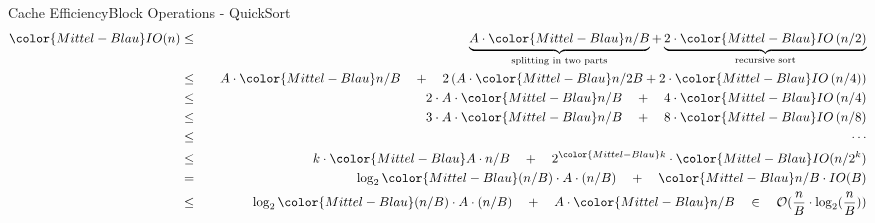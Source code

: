 \begin{frame}{Cache Efficiency}{Block Operations - QuickSort}
{\color{Mittel-Blau}
  \begin{eqnarray*}
    {\color{Mittel-Blau}IO(n)} &\leq\hspace{1em}&
      \underbrace{
        A \cdot {\color{Mittel-Blau}n / B}
      }_{\text{splitting in two parts}}
      +
      \underbrace{
        2 \cdot {\color{Mittel-Blau}IO\left(n / 2 \right)}
      }_{\text{recursive sort}}\\
    {} &\leq&
      A \cdot {\color{Mittel-Blau} n / B} \hspace{1em}+ \hspace{1em}2 \left(
        A \cdot {\color{Mittel-Blau} n /2 B}
        + 2 \cdot {\color{Mittel-Blau}IO\left( n / 4 \right)}
      \right)\\
    {} &\leq&
      2 \cdot A \cdot {\color{Mittel-Blau} n / B}
      \hspace{1em}+ \hspace{1em}4 \cdot {\color{Mittel-Blau}IO\left( n / 4 \right)}\\
    {} &\leq&
      3 \cdot A \cdot {\color{Mittel-Blau} n / B}
      \hspace{1em}+ \hspace{1em}8 \cdot {\color{Mittel-Blau}IO\left( n / 8 \right)}\\  
    {} &\leq&\hspace{1.5em}\cdots\\
    {} &\leq&
      k \cdot {\color{Mittel-Blau}A \cdot n /B }
      \hspace{1em}+\hspace{1em} 2^{\color{Mittel-Blau}k}
      \cdot {\color{Mittel-Blau}IO(n / 2^k)}\\
    {} &=&
      \log_2 {\color{Mittel-Blau} (n / B) \cdot A \cdot (n / B)}
      \hspace{1em}+\hspace{1em} {\color{Mittel-Blau} n /B \cdot IO(B)}\\
    {} &\leq&
      \log_2 {\color{Mittel-Blau} (n /B) \cdot A \cdot (n / B)}
      \hspace{1em}+\hspace{1em} A \cdot {\color{Mittel-Blau} n/ B }
      \hspace{1em} \in \hspace{1em} \mathcal{O}(\frac{n}{B}  \cdot \log_2 (\frac{n}{B}) )
  \end{eqnarray*}}
\end{frame}
